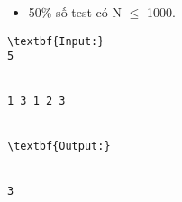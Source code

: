 \begin{itemize}
	\item     50\% số test có N  $\le$  1000.   
\end{itemize}
\begin{verbatim}
\textbf{Input:}
5


1 3 1 2 3


\textbf{Output:}


3\end{verbatim}